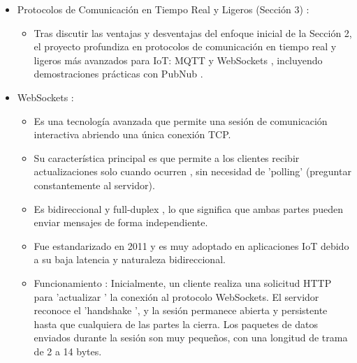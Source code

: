 \documentclass{report}
\begin{document}
\begin{itemize}
    \item Protocolos de Comunicación en Tiempo Real y Ligeros (Sección 3) :
    \begin{itemize}
        \item Tras discutir las ventajas y desventajas del enfoque inicial de la Sección 2, el proyecto profundiza en  protocolos de comunicación en tiempo 
        real y ligeros  más avanzados para IoT:  MQTT  y  WebSockets , incluyendo demostraciones prácticas con  PubNub .
    \end{itemize}

    \item WebSockets :
    \begin{itemize}
        \item Es una tecnología avanzada que permite una  sesión de comunicación interactiva  abriendo una única conexión TCP.
        \item Su característica principal es que permite a los clientes recibir actualizaciones  solo cuando ocurren , sin necesidad de  'polling' 
        (preguntar constantemente al servidor).
        \item Es  bidireccional y full-duplex , lo que significa que ambas partes pueden enviar mensajes de forma independiente.
        \item Fue estandarizado en 2011 y es muy adoptado en aplicaciones IoT debido a su  baja latencia y naturaleza bidireccional.
        \item Funcionamiento : Inicialmente, un cliente realiza una solicitud HTTP para  'actualizar ' la conexión al protocolo WebSockets. 
        El servidor reconoce el  'handshake ', y la sesión permanece abierta y persistente hasta que cualquiera de las partes la cierra. 
        Los paquetes de datos enviados durante la sesión son muy pequeños, con una longitud de trama de 2 a 14 bytes.
    \end{itemize}
    

\end{itemize}
\end{document}
